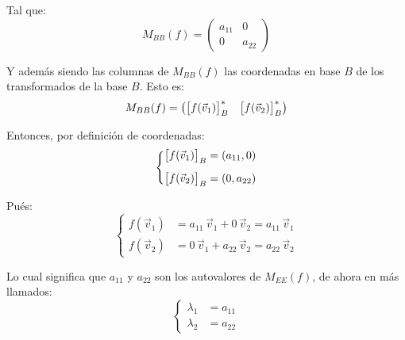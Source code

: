 \begin{mdframed}[style=ExampleFrame]
    Tal que:
    \begin{equation*}
        M_{BB}(f) =
        \begin{pmatrix}
            a_{11} & 0
            \\
            0 & a_{22}
        \end{pmatrix}
    \end{equation*}
    
    Y además siendo las columnas de $M_{BB}(f)$ las coordenadas en base $B$ de los transformados de la base $B$.
    Esto es:
    \begin{equation*}
        M_{BB}(f) =
        \begin{pmatrix}
            { \begin{bmatrix} f(\Vec{v}_1) \end{bmatrix} }_B^* & { \begin{bmatrix} f(\Vec{v}_2) \end{bmatrix} }_B^*
        \end{pmatrix}
    \end{equation*}
    
    Entonces, por definición de coordenadas:
    \begin{equation*}
        \left\{
        \begin{aligned}
            { \begin{bmatrix} f(\Vec{v}_1) \end{bmatrix} }_B &= (a_{11} , 0)
            \\[1ex]
            { \begin{bmatrix} f(\Vec{v}_2) \end{bmatrix} }_B &= (0 , a_{22})
        \end{aligned}
        \right.
    \end{equation*}
    
    Pués:
    \begin{equation*}
        \left\{
        \begin{aligned}
            f(\Vec{v}_1) &= a_{11} \, \Vec{v}_1 + 0 \, \Vec{v}_2 = a_{11} \, \Vec{v}_1
            \\
            f(\Vec{v}_2) &= 0 \, \Vec{v}_1 + a_{22} \, \Vec{v}_2 = a_{22} \, \Vec{v}_2
        \end{aligned}
        \right.
    \end{equation*}
    
    Lo cual significa que $a_{11}$ y $a_{22}$ son los autovalores de $M_{EE}(f)$, de ahora en más llamados:
    \begin{equation*}
        \left\{
        \begin{aligned}
        \lambda_1 &= a_{11}
        \\
        \lambda_2 &= a_{22}
        \end{aligned}
        \right.
    \end{equation*}
    

\end{mdframed}
